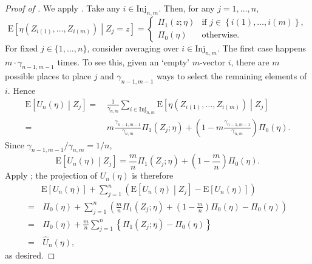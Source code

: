 \documentclass[12pt]{article}
\numberwithin{equation}{section}
\theoremstyle{definition}
\theoremstyle{plain}
\begin{document}
\begin{proof}[Proof of ]
We apply .
Take any \(i \in \mathrm{Inj}_{n, m}\).
Then, for any \(j = 1, \dots, n\),
\begin{equation*}
  \mathrm{E} \left[ \eta \left( Z_{i (1)}, \dots, Z_{i (m)} \right)
  \middle| Z_{j} = z \right] =
  \begin{cases}
    \Pi_{1} (z; \eta) & \text{if } j \in
    \left\{ i (1), \dots, i (m) \right\}, \\
    \Pi_{0} (\eta) & \text{otherwise}.
  \end{cases}
\end{equation*}
For fixed \(j \in \{1, \dots, n\}\), consider averaging over \(i \in
\mathrm{Inj}_{n, m}\).
The first case happens \(m \cdot \gamma_{n - 1, m - 1}\) times.
To see this, given an `empty' \(m\)-vector \(i\), there are \(m\) possible
places to place \(j\) and \(\gamma_{n - 1, m - 1}\) ways to select the remaining
elements of \(i\).
Hence
\begin{align*}
  \mathrm{E} \left[ U_{n} (\eta) \middle| Z_{j} \right] =
  & \, \frac{1}{\gamma_{n, m}} \sum_{i \in \mathrm{Inj}_{n, m}} \mathrm{E}
  \left[ \eta \left( Z_{i (1)}, \dots, Z_{i (m)} \right) \middle| Z_{j} \right]
  \\
  =
  & \, m \frac{\gamma_{n - 1, m - 1}}{\gamma_{n, m}} \Pi_{1} \left( Z_{j}; \eta
  \right) + \left( 1 - m \frac{\gamma_{n - 1, m - 1}}{\gamma_{n, m}} \right)
  \Pi_{0} (\eta).
\end{align*}
Since \(\gamma_{n - 1, m - 1} / \gamma_{n, m} = 1 / n\),
\begin{equation*}
  \mathrm{E} \left[ U_{n} (\eta) \middle| Z_{j} \right] = \frac{m}{n}
  \Pi_{1} \left( Z_{j}; \eta \right) + \left( 1 - \frac{m}{n} \right) \Pi_{0}
  (\eta).
\end{equation*}
Apply ; the projection of \(U_{n} (\eta)\) is
therefore
\begin{align*}
  & \mathrm{E} \left[ U_{n} (\eta) \right] + \sum_{j = 1}^{n}
  \left( \mathrm{E} \left[ U_{n} (\eta) \middle| Z_{j} \right] - \mathrm{E}
  \left[ U_{n} (\eta) \right] \right) \\
  =
  & \, \Pi_{0} (\eta) + \sum_{j = 1}^{n} \left( \frac{m}{n}
  \Pi_{1} \left( Z_{j}; \eta \right) + \left( 1 - \frac{m}{n}
  \right) \Pi_{0} (\eta) - \Pi_{0} (\eta) \right) \\
  =
  & \, \Pi_{0} (\eta) +  \frac{m}{n} \sum_{j = 1}^{n}
  \left\{ \Pi_{1} \left( Z_{j}; \eta \right) - \Pi_{0} (\eta)
  \right\} \\
  =
  & \, \widehat{U}_{n} (\eta),
\end{align*}
as desired.
\end{proof}
\end{document}
